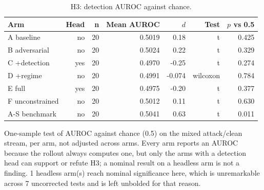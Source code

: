 \begin{table}[htbp]
  \centering
  \caption{H3: detection AUROC against chance.}
  \label{tab:auroc}
  \begin{tabular}{lrrrrrr}
    \toprule
    Arm & Head & n & Mean AUROC & $d$ & Test & $p$ vs 0.5 \\
    \midrule
    A  baseline & no & 20 & 0.5019 & 0.18 & t & 0.425 \\
    B  adversarial & no & 20 & 0.5024 & 0.22 & t & 0.329 \\
    C  +detection & yes & 20 & 0.4970 & -0.25 & t & 0.274 \\
    D  +regime & no & 20 & 0.4991 & -0.074 & wilcoxon & 0.784 \\
    E  full & yes & 20 & 0.4975 & -0.20 & t & 0.377 \\
    F  unconstrained & no & 20 & 0.5012 & 0.11 & t & 0.630 \\
    A-S benchmark & no & 20 & 0.5041 & 0.63 & t & 0.011 \\
    \bottomrule
  \end{tabular}
  \begin{minipage}{\linewidth}\vspace{4pt}\footnotesize One-sample test of AUROC against chance (0.5) on the mixed attack/clean stream, per arm, not adjusted across arms. Every arm reports an AUROC because the rollout always computes one, but only the arms with a detection head can support or refute H3; a nominal result on a headless arm is not a finding. 1 headless arm(s) reach nominal significance here, which is unremarkable across 7 uncorrected tests and is left unbolded for that reason.\end{minipage}
\end{table}
